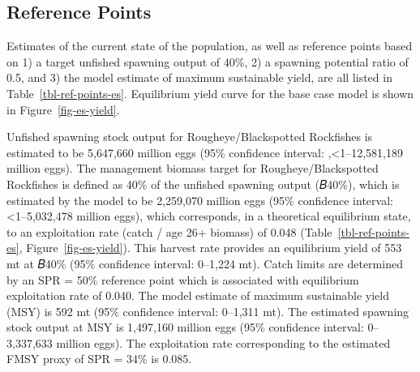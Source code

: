 \documentclass[
]{scrartcl}
\begin{document}
\subsection{Reference Points}\label{reference-points}

Estimates of the current state of the population, as well as reference
points based on 1) a target unfished spawning output of 40\%, 2) a
spawning potential ratio of 0.5, and 3) the model estimate of maximum
sustainable yield, are all listed in Table~\ref{tbl-ref-points-es}.
Equilibrium yield curve for the base case model is shown in
Figure~\ref{fig-es-yield}.

Unfished spawning stock output for Rougheye/Blackspotted Rockfishes is
estimated to be 5,647,660 million eggs (95\% confidence interval:
,\textless1--12,581,189 million eggs). The management biomass target for
Rougheye/Blackspotted Rockfishes is defined as 40\% of the unfished
spawning output (𝐵40\%), which is estimated by the model to be 2,259,070
million eggs (95\% confidence interval: \textless1--5,032,478 million
eggs), which corresponds, in a theoretical equilibrium state, to an
exploitation rate (catch / age 26+ biomass) of 0.048
(Table~\ref{tbl-ref-points-es}, Figure~\ref{fig-es-yield}). This harvest
rate provides an equilibrium yield of 553 mt at 𝐵40\% (95\% confidence
interval: 0--1,224 mt). Catch limits are determined by an SPR = 50\%
reference point which is associated with equilibrium exploitation rate
of 0.040. The model estimate of maximum sustainable yield (MSY) is 592
mt (95\% confidence interval: 0--1,311 mt). The estimated spawning stock
output at MSY is 1,497,160 million eggs (95\% confidence interval:
0--3,337,633 million eggs). The exploitation rate corresponding to the
estimated FMSY proxy of SPR = 34\% is 0.085.

\clearpage

\begingroup
\fontsize{9.0pt}{10.8pt}\selectfont
\end{document}

